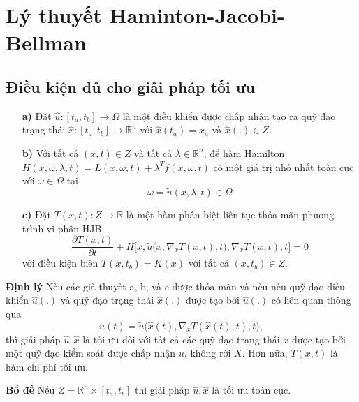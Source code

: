\documentclass[11pt]{beamer}
\begin{document}
\section{Lý thuyết Haminton-Jacobi-Bellman}

\subsection{Điều kiện đủ cho giải pháp tối ưu}
\begin{frame}
	\begin{enumerate}
		\item[\textbf{a)}] Đặt $\hat{u}: [t_a, t_b] \to \Omega$ là một điều khiển được chấp nhận tạo ra quỹ đạo trạng thái $\hat{x}: [t_a, t_b] \to \mathbb{R}^n$ với $\hat{x}(t_a) = x_a$ và $\hat{x}(.) \in Z$.
		\item [\textbf{b)}] Với tất cả $(x, t) \in Z$ và tất cả $\lambda \in \mathbb{R}^n$, để hàm Hamilton $H(x, \omega, \lambda, t) = L(x, \omega, t) + \lambda^Tf(x, \omega, t)$ có một giá trị nhỏ nhất toàn cục với $\omega \in \Omega$ tại $$\omega = \tilde{u}(x, \lambda, t) \in \Omega $$
		\item[\textbf{c)}] Đặt $T(x, t): Z \to \mathbb{R}$ là một hàm phân biệt liên tục thỏa mãn phương trình vi phân HJB $$\frac{\partial T(x, t)}{\partial t} + H\bigg[x, \tilde{u}\big(x, \nabla_xT(x, t), t\big), \nabla_xT(x, t), t\bigg] = 0$$ với điều kiện biên $T(x, t_b) = K(x)$ với tất cả $(x, t_b) \in Z$.
	\end{enumerate}

\end{frame}

\begin{frame}
	\begin{block}{\textbf{Định lý}}
		Nếu các giả thuyết a, b, và c được thỏa mãn và nếu nếu quỹ đạo điều khiển $\hat{u}(.)$ và quỹ đạo trạng thái $\hat{x}(.)$ được tạo bởi $\hat{u}(.)$ có liên quan thông qua $$\hat{u}(t) = \tilde{u}\big(\hat{x}(t), \nabla_xT(\hat{x}(t), t), t\big), $$ 
		thì giải pháp $\hat{u}, \hat{x}$ là tối ưu đối với tất cả các quỹ đạo trạng thái $x$ được tạo bởi một quỹ đạo kiểm soát được chấp nhận $u$, không rời $X$. Hơn nữa, $T(x, t)$ là hàm chi phí tối ưu.
	\end{block}
	\begin{exampleblock}{\textbf{Bổ đề}}
		Nếu $Z = \mathbb{R}^n \times [t_a, t_b]$ thì giải pháp $\hat{u}, \hat{x}$ là tối ưu toàn cục.
	\end{exampleblock}
\end{frame}
\end{document}
